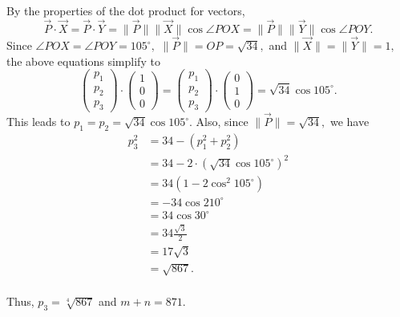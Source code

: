 \begin{enumerate}
 By the properties of the dot product for vectors, 
 \[\overrightarrow{P}\cdot\overrightarrow{X}=\overrightarrow{P}\cdot\overrightarrow{Y}=\|\overrightarrow{P}\|\|\overrightarrow{X}\|\cos\angle{POX}=\|\overrightarrow{P}\|\|\overrightarrow{Y}\|\cos\angle{POY}.\] Since $\angle{POX}=\angle{POY}=105^\circ,$ $\|\overrightarrow{P}\|=OP=\sqrt{34},$ and $\|\overrightarrow{X}\|=\|\overrightarrow{Y}\|=1,$ the above equations simplify to
 \[\begin{pmatrix} p_1 \\ p_2 \\ p_3 \end{pmatrix}\cdot\begin{pmatrix} 1 \\ 0 \\ 0 \end{pmatrix}=\begin{pmatrix} p_1 \\ p_2 \\ p_3 \end{pmatrix}\cdot\begin{pmatrix} 0 \\ 1 \\ 0 \end{pmatrix}=\sqrt{34}\cos 105^\circ.\]This leads to $p_1=p_2=\sqrt{34}\cos 105^\circ.$ Also, since $\|\overrightarrow{P}\|=\sqrt{34},$ we have \begin{align*}p_3^2&=34-(p_1^2+p_2^2)\\&=34-2\cdot(\sqrt{34}\cos 105^\circ)^2\\&=34(1-2\cos^2 105^\circ)\\&=-34\cos 210^\circ\\&=34\cos 30^\circ\\&=34\frac{\sqrt{3}}{2}\\&=17\sqrt{3}\\&=\sqrt{867}.\\\end{align*}


 Thus, $p_3=\sqrt[4]{867}$ and $m+n=\boxed{871}.$



\end{enumerate}